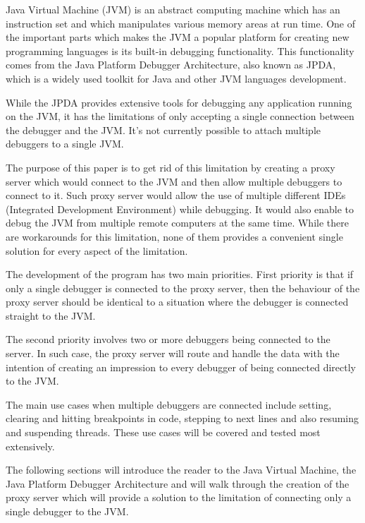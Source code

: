 \documentclass[..thesis.tex]{subfiles}
\begin{document}
Java Virtual Machine (JVM) is an abstract computing machine which has an instruction set and which manipulates various memory areas at run time.\cite{oracle_jvm_spec}
% 
% 
One of the important parts which makes the JVM a popular platform for creating new programming languages is its built-in debugging functionality. 
This functionality comes from the Java Platform Debugger Architecture, also known as JPDA, which is a widely used toolkit for Java and other JVM languages development.

While the JPDA provides extensive tools for debugging any application running on the JVM, it has the limitations of only accepting a single connection between the debugger and the JVM. 
It's not currently possible to attach multiple debuggers to a single JVM.

The purpose of this paper is to get rid of this limitation by creating a proxy server which would connect to the JVM and then allow multiple debuggers to connect to it. 
Such proxy server would allow the use of multiple different IDEs (Integrated Development Environment) while debugging. 
It would also enable to debug the JVM from multiple remote computers at the same time. 
While there are workarounds for this limitation, none of them provides a convenient single solution for every aspect of the limitation. 

The development of the program has two main priorities. 
First priority is that if only a single debugger is connected to the proxy server, then the behaviour of the proxy server should be identical to a situation where the debugger is connected straight to the JVM.

The second priority involves two or more debuggers being connected to the server. 
In such case, the proxy server will route and handle the data with the intention of creating an impression to every debugger of being connected directly to the JVM.

The main use cases when multiple debuggers are connected include setting, clearing and hitting breakpoints in code, stepping to next lines and also resuming and suspending threads.
These use cases will be covered and tested most extensively.

The following sections will introduce the reader to the Java Virtual Machine, the Java Platform Debugger Architecture and will walk through the creation of the proxy server which will provide a solution to the limitation of connecting only a single debugger to the JVM.
\end{document}
